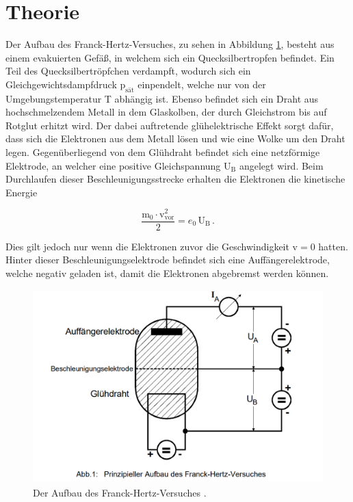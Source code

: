 \section{Theorie}

\begin{flushleft}
    Der Aufbau des Franck-Hertz-Versuches, zu sehen in Abbildung \ref{Abbildung1}, besteht aus einem evakuierten Gefäß, in welchem sich ein Quecksilbertropfen befindet.
    Ein Teil des Quecksilbertröpfchen verdampft, wodurch sich ein Gleichgewichtsdampfdruck $\text{p}_{\text{sät}}$ einpendelt, welche nur von der Umgebungstemperatur T abhängig ist.
    Ebenso befindet sich ein Draht aus hochschmelzendem Metall in dem Glaskolben, der durch Gleichstrom bis auf Rotglut erhitzt wird.
    Der dabei auftretende glühelektrische Effekt sorgt dafür, dass sich die Elektronen aus dem Metall lösen und wie eine Wolke um den Draht legen.
    Gegenüberliegend von dem Glühdraht befindet sich eine netzförmige Elektrode, an welcher eine positive Gleichspannung $\text{U}_{\text{B}}$ angelegt wird.
    Beim Durchlaufen dieser Beschleunigungsstrecke erhalten die Elektronen die kinetische Energie 
\end{flushleft}

\begin{equation}
    \frac{\text{m}_{0} \cdot \text{v}^{2}_{\text{vor}}}{2} = e_{0}\,\text{U}_{\text{B}}\,. \label{1}
\end{equation}

\begin{flushleft}
    Dies gilt jedoch nur wenn die Elektronen zuvor die Geschwindigkeit $\text{v} = 0$ hatten. 
    Hinter dieser Beschleunigungselektrode befindet sich eine Auffängerelektrode, welche negativ geladen ist, damit die Elektronen abgebremst werden können.
\end{flushleft}

\begin{figure}[H]
    \centering
    \includegraphics[height=75mm]{bilder/Ab1.png}
    \caption{Der Aufbau des Franck-Hertz-Versuches \cite{a1}. \label{Abbildung1}}
\end{figure}

